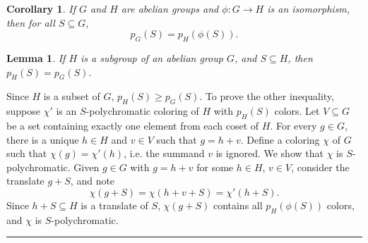 \documentclass[12pt]{article}
\newenvironment{proof}{{\bf Proof:  }}{\hfill\rule{2mm}{2mm}}
\newtheorem{lemma}[theorem]{Lemma}
\newtheorem{corollary}[theorem]{Corollary}
\begin{document}
\begin{corollary}\label{iso}
If $G$ and $H$ are abelian groups and $\phi: G \to H$ is an isomorphism, then for all $S \subseteq G$, \[p_G(S) = p_H(\phi(S)).\]
\end{corollary}

\begin{lemma}\label{ambient}
If $H$ is a subgroup of an abelian group $G$, and $S \subseteq H$, then $p_H(S) = p_G(S)$.
\end{lemma}

\begin{proof}
Since $H$ is a subset of $G$, $p_H(S) \ge p_G(S)$.  To prove the other inequality, suppose $\chi'$ is an $S$-polychromatic coloring of $H$ with $p_H(S)$ colors.  Let $V \subseteq G$ be a set containing exactly one element from each coset of $H$.  For every $g \in G$, there is a unique $h \in H$ and $v \in V$ such that $g = h+v$.  Define a coloring $\chi$ of $G$ such that $\chi(g)= \chi'(h)$, i.e. the summand $v$ is ignored.  We show that $\chi$ is $S$-polychromatic.  Given $g\in G$ with $g=h+v$ for some $h \in H$, $v \in V$, consider the translate $g+S$, and note
\[\chi(g+S) = \chi(h+v+S) = \chi'(h+S).\]
Since $h+S \subseteq H$ is a translate of $S$, $\chi(g+S)$ contains all $p_H(\phi(S))$ colors, and $\chi$ is $S$-polychromatic.
\end{proof}


\end{document}
